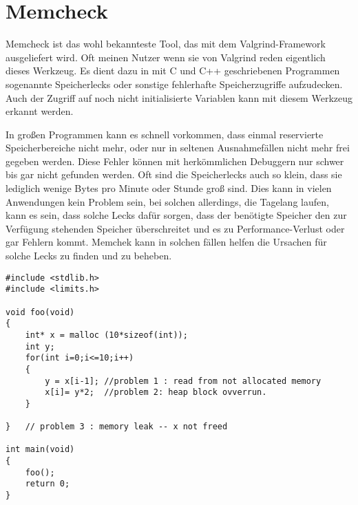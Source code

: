 \section{Memcheck}
Memcheck ist das wohl bekannteste Tool, das mit dem Valgrind-Framework ausgeliefert wird. Oft meinen Nutzer wenn sie von Valgrind reden eigentlich dieses Werkzeug. Es dient dazu in mit C und C++ geschriebenen Programmen sogenannte Speicherlecks oder sonstige fehlerhafte Speicherzugriffe aufzudecken. Auch der Zugriff auf noch nicht initialisierte Variablen kann mit diesem Werkzeug erkannt werden.

In großen Programmen kann es schnell vorkommen, dass einmal reservierte Speicherbereiche nicht mehr, oder nur in seltenen Ausnahmefällen nicht mehr frei gegeben werden. Diese Fehler können mit herkömmlichen Debuggern nur schwer bis gar nicht gefunden werden. Oft sind die Speicherlecks auch so klein, dass sie lediglich wenige Bytes pro Minute oder Stunde groß sind. Dies kann in vielen Anwendungen kein Problem sein, bei solchen allerdings, die Tagelang laufen, kann es sein, dass solche Lecks dafür sorgen, dass der benötigte Speicher den zur Verfügung stehenden Speicher überschreitet und es zu Performance-Verlust oder gar Fehlern kommt. Memchek kann in solchen fällen helfen die Ursachen für solche Lecks zu finden und zu beheben.

\begin{lstlisting}
#include <stdlib.h>
#include <limits.h>

void foo(void)
{
	int* x = malloc (10*sizeof(int));
	int y;
	for(int i=0;i<=10;i++) 
	{
		y = x[i-1];	//problem 1 : read from not allocated memory
		x[i]= y*2;	//problem 2: heap block ovverrun.
	}
	
}	// problem 3 : memory leak -- x not freed
	
int main(void)
{
	foo();
	return 0;
}
\end{lstlisting}